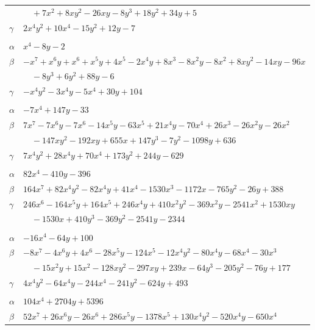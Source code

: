 \documentclass[11pt]{article}
\begin{document}
\begin{longtable}{@{}ll@{}}
 & $\quad +7x^{2}+8xy^{2}-26xy-8y^{3}+18y^{2}+34y+5$\\
$\gamma$ & $2x^{4}y^{2}+10x^{4}-15y^{2}+12y-7$\\
\addlinespace[3pt]
\multicolumn{2}{@{}l}{$\{i,j\}=\{11,27\}$, $k_{ij}=2^{2}\cdot 5^{2}$}\\
$\alpha$ & $x^{4}-8y-2$\\
$\beta$ & $-x^{7}+x^{6}y+x^{6}+x^{5}y+4x^{5}-2x^{4}y+8x^{3}-8x^{2}y-8x^{2}+8xy^{2}-14xy-96x$\\
 & $\quad -8y^{3}+6y^{2}+88y-6$\\
$\gamma$ & $-x^{4}y^{2}-3x^{4}y-5x^{4}+30y+104$\\
\addlinespace[3pt]
\multicolumn{2}{@{}l}{$\{i,j\}=\{11,36\}$, $k_{ij}=2^{3}\cdot 5$}\\
$\alpha$ & $-7x^{4}+147y-33$\\
$\beta$ & $7x^{7}-7x^{6}y-7x^{6}-14x^{5}y-63x^{5}+21x^{4}y-70x^{4}+26x^{3}-26x^{2}y-26x^{2}$\\
 & $\quad -147xy^{2}-192xy+655x+147y^{3}-7y^{2}-1098y+636$\\
$\gamma$ & $7x^{4}y^{2}+28x^{4}y+70x^{4}+173y^{2}+244y-629$\\
\addlinespace[3pt]
\multicolumn{2}{@{}l}{$\{i,j\}=\{12,21\}$, $k_{ij}=2^{3}$}\\
$\alpha$ & $82x^{4}-410y-396$\\
$\beta$ & $164x^{7}+82x^{4}y^{2}-82x^{4}y+41x^{4}-1530x^{3}-1172x-765y^{2}-26y+388$\\
$\gamma$ & $246x^{6}-164x^{5}y+164x^{5}+246x^{4}y+410x^{2}y^{2}-369x^{2}y-2541x^{2}+1530xy$\\
 & $\quad -1530x+410y^{3}-369y^{2}-2541y-2344$\\
\addlinespace[3pt]
\multicolumn{2}{@{}l}{$\{i,j\}=\{12,27\}$, $k_{ij}=2^{3}\cdot 3^{3}$}\\
$\alpha$ & $-16x^{4}-64y+100$\\
$\beta$ & $-8x^{7}-4x^{6}y+4x^{6}-28x^{5}y-124x^{5}-12x^{4}y^{2}-80x^{4}y-68x^{4}-30x^{3}$\\
 & $\quad -15x^{2}y+15x^{2}-128xy^{2}-297xy+239x-64y^{3}-205y^{2}-76y+177$\\
$\gamma$ & $4x^{4}y^{2}-64x^{4}y-244x^{4}-241y^{2}-624y+493$\\
\addlinespace[3pt]
\multicolumn{2}{@{}l}{$\{i,j\}=\{12,30\}$, $k_{ij}=2^{3}\cdot 3^{5}\cdot 5^{2}$}\\
$\alpha$ & $104x^{4}+2704y+5396$\\
$\beta$ & $52x^{7}+26x^{6}y-26x^{6}+286x^{5}y-1378x^{5}+130x^{4}y^{2}-520x^{4}y-650x^{4}$\\

\end{longtable}
\end{document}
